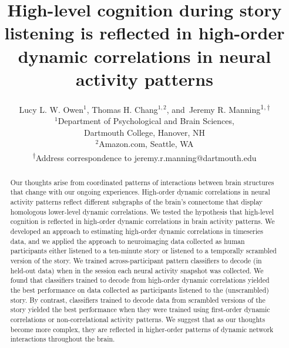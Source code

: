 \documentclass[english]{article}
\title{High-level cognition during story listening is reflected in
  high-order dynamic correlations in neural activity patterns}
\author{Lucy L. W. Owen$^1$, Thomas H. Chang$^{1,2}$, and\
  Jeremy R. Manning\textsuperscript{$1, \dagger$}\\
  [0.1in]$^1$Department of Psychological and Brain
  Sciences,\\Dartmouth
  College, Hanover, NH\\
  $^2$Amazon.com, Seattle, WA\\
  \textsuperscript{$\dagger$}Address correspondence to
  jeremy.r.manning@dartmouth.edu}
\begin{document}
\maketitle


\begin{abstract}
  Our thoughts arise from coordinated patterns of interactions between
  brain structures that change with our ongoing experiences.
  High-order dynamic correlations in neural activity patterns reflect
  different subgraphs of the brain's connectome that display
  homologous lower-level dynamic correlations.  We tested the
  hypothesis that high-level cognition is reflected in high-order
  dynamic correlations in brain activity patterns.  We developed an
  approach to estimating high-order dynamic correlations in timeseries
  data, and we applied the approach to neuroimaging data collected as
  human participants either listened to a ten-minute story or listened
  to a temporally scrambled version of the story.  We trained
  across-participant pattern classifiers to decode (in held-out data)
  when in the session each neural activity snapshot was collected.  We
  found that classifiers trained to decode from high-order dynamic
  correlations yielded the best performance on data collected as
  participants listened to the (unscrambled) story.  By contrast,
  classifiers trained to decode data from scrambled versions of the
  story yielded the best performance when they were trained using
  first-order dynamic correlations or non-correlational activity
  patterns.  We suggest that as our thoughts become more complex, they
  are reflected in higher-order patterns of dynamic network
  interactions throughout the brain.
\end{abstract}

\doublespacing
\end{document}
